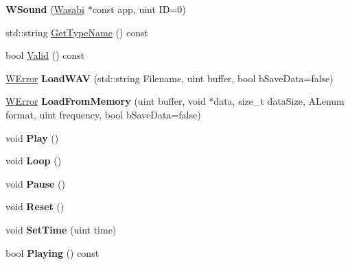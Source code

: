 \begin{DoxyCompactItemize}
\item 
{\bfseries W\+Sound} (\hyperlink{class_wasabi}{Wasabi} $\ast$const app, uint ID=0)\hypertarget{class_w_sound_ab5e4c75da0f601a64594643bcf9dd63f}{}\label{class_w_sound_ab5e4c75da0f601a64594643bcf9dd63f}

\item 
std\+::string \hyperlink{class_w_sound_a4107f973aaf45ee2a30c4d3edde9849c}{Get\+Type\+Name} () const 
\item 
bool \hyperlink{class_w_sound_a31bb4282a170586342bae071c4e19aa2}{Valid} () const 
\item 
\hyperlink{class_w_error}{W\+Error} {\bfseries Load\+W\+AV} (std\+::string Filename, uint buffer, bool b\+Save\+Data=false)\hypertarget{class_w_sound_a58a45ee0e18cb3bcfd4c78b971dc29e1}{}\label{class_w_sound_a58a45ee0e18cb3bcfd4c78b971dc29e1}

\item 
\hyperlink{class_w_error}{W\+Error} {\bfseries Load\+From\+Memory} (uint buffer, void $\ast$data, size\+\_\+t data\+Size, A\+Lenum format, uint frequency, bool b\+Save\+Data=false)\hypertarget{class_w_sound_af16d9830fd1d7a7138c0d5b46c38f772}{}\label{class_w_sound_af16d9830fd1d7a7138c0d5b46c38f772}

\item 
void {\bfseries Play} ()\hypertarget{class_w_sound_a44a7c0cc97dc9b138e49e39a24f0b04f}{}\label{class_w_sound_a44a7c0cc97dc9b138e49e39a24f0b04f}

\item 
void {\bfseries Loop} ()\hypertarget{class_w_sound_a701c465342bbd6b2d0a55d94a5b5c7a2}{}\label{class_w_sound_a701c465342bbd6b2d0a55d94a5b5c7a2}

\item 
void {\bfseries Pause} ()\hypertarget{class_w_sound_a657379b2d8ed48aa06c0afa4da9ab468}{}\label{class_w_sound_a657379b2d8ed48aa06c0afa4da9ab468}

\item 
void {\bfseries Reset} ()\hypertarget{class_w_sound_a67994668984967bcab54cbd1bc878ce2}{}\label{class_w_sound_a67994668984967bcab54cbd1bc878ce2}

\item 
void {\bfseries Set\+Time} (uint time)\hypertarget{class_w_sound_a491433ff827c5a2873cd25b9de9ff1e7}{}\label{class_w_sound_a491433ff827c5a2873cd25b9de9ff1e7}

\item 
bool {\bfseries Playing} () const \hypertarget{class_w_sound_ad64e182e9f53ea7c6ed9f7c420d9e56c}{}\label{class_w_sound_ad64e182e9f53ea7c6ed9f7c420d9e56c}


\end{DoxyCompactItemize}
